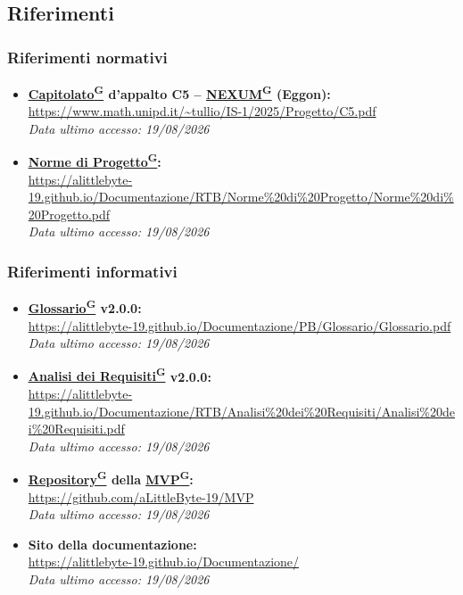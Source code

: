\documentclass[a4paper,12pt]{article}
\providecommand{\glslink}[2]{\href{https://alittlebyte-19.github.io/Documentazione/glossario.html\#gls-#1}{\underline{#2}\textsuperscript{\scriptsize G}}}
\begin{document}
\subsection{Riferimenti}

\subsubsection{Riferimenti normativi}

\begin{itemize}
    \item \textbf{\glslink{capitolato}{Capitolato} d'appalto C5 -- \glslink{nexum}{NEXUM} (Eggon):}\\
    \url{https://www.math.unipd.it/~tullio/IS-1/2025/Progetto/C5.pdf}\\
    \textit{Data ultimo accesso: 19/08/2026}
    \item \textbf{\glslink{norme-di-progetto}{Norme di Progetto}:}\\
    \url{https://alittlebyte-19.github.io/Documentazione/RTB/Norme\%20di\%20Progetto/Norme\%20di\%20Progetto.pdf}\\
    \textit{Data ultimo accesso: 19/08/2026}
\end{itemize}

\subsubsection{Riferimenti informativi}

\begin{itemize}
    \item \textbf{\glslink{glossario}{Glossario} v2.0.0:}\\
    \url{https://alittlebyte-19.github.io/Documentazione/PB/Glossario/Glossario.pdf}\\
    \textit{Data ultimo accesso: 19/08/2026}
    \item \textbf{\glslink{analisi-dei-requisiti-adr}{Analisi dei Requisiti} v2.0.0:}\\
    \url{https://alittlebyte-19.github.io/Documentazione/RTB/Analisi\%20dei\%20Requisiti/Analisi\%20dei\%20Requisiti.pdf}\\
    \textit{Data ultimo accesso: 19/08/2026}
    \item \textbf{\glslink{repository}{Repository} della \glslink{mvp-minimum-viable-product}{MVP}:}\\
    \url{https://github.com/aLittleByte-19/MVP}\\
    \textit{Data ultimo accesso: 19/08/2026}
    \item \textbf{Sito della documentazione:}\\
    \url{https://alittlebyte-19.github.io/Documentazione/}\\
    \textit{Data ultimo accesso: 19/08/2026}
\end{itemize}
\end{document}
